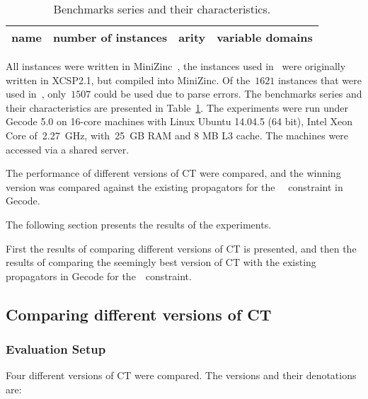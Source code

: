 \documentclass[a4paper,11pt]{article}
\newcommand{\Secref}[1]{Section~\ref{#1}}
\newcommand{\Table}{\Constraint{Table}~}
\newcommand{\CTpaper}[0]{DBLP:conf/cp/DemeulenaereHLP16}
\numberwithin{equation}{section}
\begin{document}
\begin{table}[h]\small
  \caption{Benchmarks series and their characteristics.}
  \label{tab:benchmarks}
  \centering
  \begin{tabular}{lccc}  %
    name & number of instances & arity & variable domains \\
    \midrule
     
  \end{tabular}
\end{table}

All instances were written in MiniZinc~\cite{MiniZinc}, the
instances used in~\cite{\CTpaper} were originally written in XCSP2.1,
but compiled into MiniZinc. Of the~$1621$ instances that were used in~\cite{\CTpaper},
only~$1507$ could be used due to parse errors.
The benchmarks series and their characteristics are presented in Table~\ref{tab:benchmarks}.
The experiments were run
under Gecode 5.0 on 16-core machines with Linux Ubuntu 14.04.5 (64 bit),
Intel Xeon Core of~2.27~GHz, with~25~GB RAM and 8 MB L3 cache. The machines
were accessed via a shared server.

The performance of different versions of CT were compared, and the winning
version was compared against the existing propagators for
the \Table~constraint in Gecode.

The following section presents the results of the experiments.

First the results of comparing different versions of CT is presented,
and then the results of comparing the seemingly best version of CT with 
the existing propagators in Gecode for the~\Table constraint.





\subsection{Comparing different versions of CT}
\label{sec:compare}

\subsubsection{Evaluation Setup}
Four different versions of CT were compared.
The versions and their denotations are:
\end{document}
